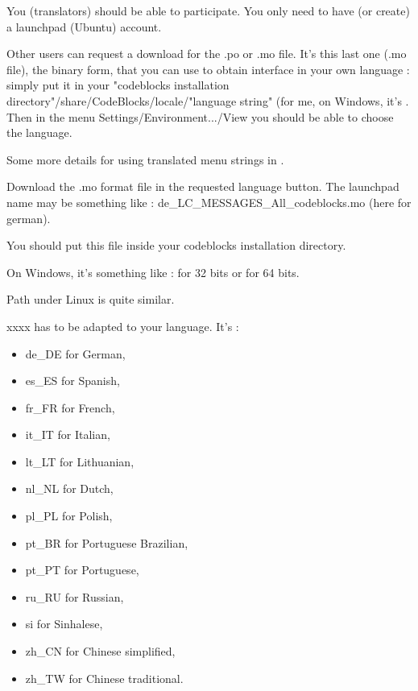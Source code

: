 You (translators) should be able to participate. You only need to have (or create) a launchpad (Ubuntu) account.

Other users can request a download for the .po or .mo file. It's this last one (.mo file), the binary form, that you can use to obtain \codeblocks interface in your own language : simply put it in your "codeblocks installation directory"/share/CodeBlocks/locale/"language string" (for me, on Windows, it's\newline
 . Then in the menu Settings/Environment.../View you should be able to choose the language.

Some more details for using translated menu strings in \codeblocks.

Download the .mo format file in the requested language button. The launchpad name may be something like : de\_LC\_MESSAGES\_All\_codeblocks.mo (here for german).

You should put this file inside your codeblocks installation directory.

On Windows, it's something like :\newline
{} for 32 bits\newline
 or\newline
{} for 64 bits.

Path under Linux is quite similar.

xxxx has to be adapted to your language. It's :
\begin{itemize}
\item de\_DE for German,
\item es\_ES for Spanish,
\item fr\_FR for French,
\item it\_IT for Italian,
\item lt\_LT for Lithuanian,
\item nl\_NL for Dutch,
\item pl\_PL for Polish,
\item pt\_BR for Portuguese Brazilian,
\item pt\_PT for Portuguese,
\item ru\_RU for Russian,
\item si     for Sinhalese,
\item zh\_CN for Chinese simplified,
\item zh\_TW for Chinese traditional.
\end{itemize}

